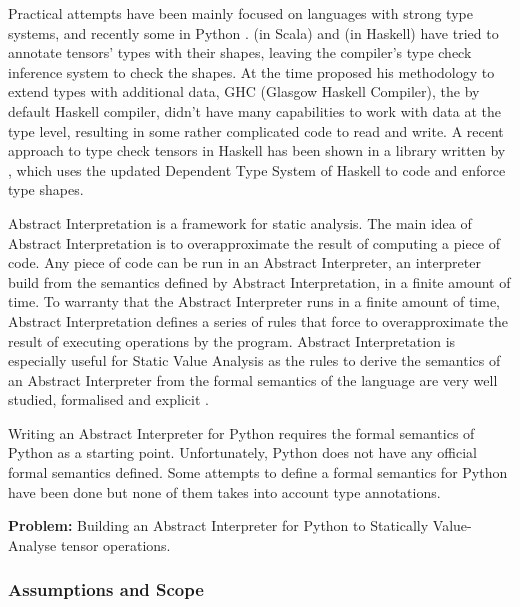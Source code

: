 Practical attempts have been mainly focused on languages with strong
type systems, and recently some in Python
\autocites{fromherz_static_2018}{monat_static_2018}.
\textcite{chen_typesafe_2017} (in Scala) and
\textcite{eaton_statically_2006} (in Haskell) have tried to annotate
tensors' types with their shapes, leaving the compiler's type check
inference system to check the shapes. At the time
\textcite{eaton_statically_2006} proposed his methodology to extend
types with additional data, GHC (Glasgow Haskell Compiler), the by
default Haskell compiler, didn't have many capabilities to work with
data at the type level, resulting in some rather complicated code to
read and write. A recent approach to type check tensors in Haskell has
been shown in a library written by \textcite{elkin_haskell_2018}, which
uses the updated Dependent Type System of Haskell to code and enforce
type shapes.

Abstract Interpretation is a framework for static analysis. The main
idea of Abstract Interpretation is to overapproximate the result of
computing a piece of code. Any piece of code can be run in an Abstract
Interpreter, an interpreter build from the semantics defined by Abstract
Interpretation, in a finite amount of time. To warranty that the
Abstract Interpreter runs in a finite amount of time, Abstract
Interpretation defines a series of rules that force to overapproximate
the result of executing operations by the program. Abstract
Interpretation is especially useful for Static Value Analysis as the
rules to derive the semantics of an Abstract Interpreter from the formal
semantics of the language are very well studied, formalised and explicit
\autocite{cousot_abstract_1977}.

Writing an Abstract Interpreter for Python requires the formal semantics
of Python as a starting point. Unfortunately, Python does not have any
official formal semantics defined. Some attempts to define a formal
semantics for Python have been done
\autocites{politz_python_2013}{fromherz_static_2018}{guth_formal_2013}{ranson_semantics_2008}
but none of them takes into account type annotations.

\textbf{Problem:} Building an Abstract Interpreter for Python to
Statically Value-Analyse tensor operations.


\subsubsection{Assumptions and Scope}

